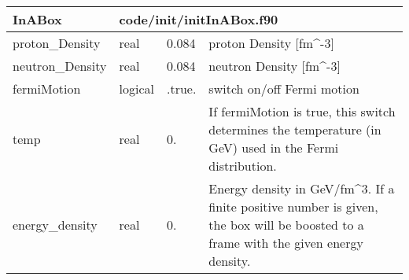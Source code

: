 \documentclass{article}
\begin{document}
\begin{longtable}{llll}
\toprule
\textbf{\large{InABox}} & \multicolumn{3}{l}{\footnotesize{code/init/initInABox.f90}}\\*
\midrule
\endfirsthead
\midrule
\endhead
proton\_Density & \begin{minipage}[t]{2cm}real\end{minipage} & \begin{minipage}[t]{2cm}0.084\end{minipage} & \begin{minipage}[t]{12cm}proton Density [fm\^{}-3]\end{minipage}\\*
\midrule
neutron\_Density & \begin{minipage}[t]{2cm}real\end{minipage} & \begin{minipage}[t]{2cm}0.084\end{minipage} & \begin{minipage}[t]{12cm}neutron Density [fm\^{}-3]\end{minipage}\\*
\midrule
fermiMotion & \begin{minipage}[t]{2cm}logical\end{minipage} & \begin{minipage}[t]{2cm}.true.\end{minipage} & \begin{minipage}[t]{12cm}switch on/off Fermi motion\end{minipage}\\*
\midrule
temp & \begin{minipage}[t]{2cm}real\end{minipage} & \begin{minipage}[t]{2cm}0.\end{minipage} & \begin{minipage}[t]{12cm}If fermiMotion is true, this switch determines the temperature (in GeV) used in the Fermi distribution.\end{minipage}\\*
\midrule
energy\_density & \begin{minipage}[t]{2cm}real\end{minipage} & \begin{minipage}[t]{2cm}0.\end{minipage} & \begin{minipage}[t]{12cm}Energy density in GeV/fm\^{}3. If a finite positive number is given, the box will be boosted to a frame with the given energy density.\end{minipage}\\*

\end{longtable}
\end{document}

